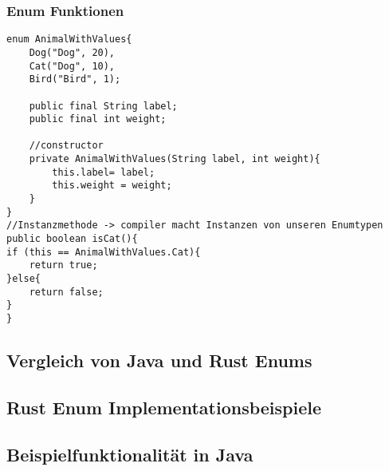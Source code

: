 \documentclass[a4paper, 1ppt]{article}
\begin{document}
\subsubsection{Enum Funktionen}
\begin{verbatim}
enum AnimalWithValues{
    Dog("Dog", 20),
    Cat("Dog", 10),
    Bird("Bird", 1);

    public final String label;
    public final int weight;

    //constructor
    private AnimalWithValues(String label, int weight){
        this.label= label;
        this.weight = weight;
    }
}
//Instanzmethode -> compiler macht Instanzen von unseren Enumtypen
public boolean isCat(){
if (this == AnimalWithValues.Cat){
	return true;
}else{
	return false;
}
}
\end{verbatim}
\subsection{Vergleich von Java und Rust Enums}
\subsection{Rust Enum Implementationsbeispiele}
\subsubsection{}
\subsection{Beispielfunktionalität in Java}
\end{document}
